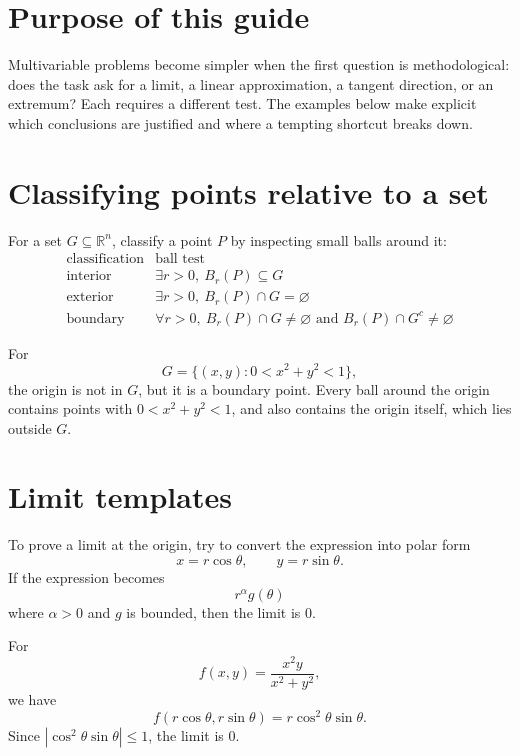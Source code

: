 
\section{Purpose of this guide}

Multivariable problems become simpler when the first question is methodological: does the task ask for a limit, a linear approximation, a tangent direction, or an extremum? Each requires a different test. The examples below make explicit which conclusions are justified and where a tempting shortcut breaks down.

\section{Classifying points relative to a set}

For a set \(G\subseteq\mathbb R^n\), classify a point \(P\) by inspecting small balls around it:
\[
\begin{array}{c|c}
\text{classification} & \text{ball test}\\
\hline
\text{interior} & \exists r>0,\ B_r(P)\subseteq G\\
\text{exterior} & \exists r>0,\ B_r(P)\cap G=\varnothing\\
\text{boundary} & \forall r>0,\ B_r(P)\cap G\ne\varnothing
\text{ and }B_r(P)\cap G^c\ne\varnothing
\end{array}
\]

\begin{example}
For
\[
  G=\{(x,y):0<x^2+y^2<1\},
\]
the origin is not in \(G\), but it is a boundary point.  Every ball around the origin contains points with \(0<x^2+y^2<1\), and also contains the origin itself, which lies outside \(G\).
\end{example}

\section{Limit templates}

To prove a limit at the origin, try to convert the expression into polar form
\[
  x=r\cos\theta,\qquad y=r\sin\theta.
\]
If the expression becomes
\[
  r^\alpha g(\theta)
\]
where \(\alpha>0\) and \(g\) is bounded, then the limit is \(0\).

\begin{example}
For
\[
  f(x,y)=\frac{x^2y}{x^2+y^2},
\]
we have
\[
  f(r\cos\theta,r\sin\theta)
  =r\cos^2\theta\sin\theta.
\]
Since \(|\cos^2\theta\sin\theta|\le1\), the limit is \(0\).
\end{example}

